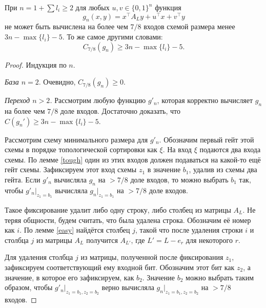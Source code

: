 \documentclass[a4paper, 14pt]{extarticle}
\begin{document}
\begin{theorem} \label{main}
При $n = 1 + \sum l_i \geq 2$ для любых $u, v \in \{0, 1\}^n$ функция
\[
g_n(x, y) = x^\top A_L y + u^\top x + v^\top y
\]
не может быть вычислена на более чем $7/8$ входов схемой размера менее $3n -
\max \{l_i\} - 5$. То же самое другими словами:
\[
C_{7/8}(g_n) \geq 3n - \max \{l_i\} - 5.
\]
\end{theorem}
\begin{proof}
Индукция по $n$.

\emph{База $n = 2$}. Очевидно, $C_{7/8}(g_n) \geq 0$.

\emph{Переход $n > 2$.} Рассмотрим любую функцию $g'_n$, которая корректно
вычисляет $g_n$ на более чем $7/8$ доле входов. Достаточно доказать, что
$C(g_n') \geq 3n - \max \{l_i\} - 5$.

Рассмотрим схему минимального размера для $g'_n$. Обозначим первый гейт этой
схемы в порядке топологической сортировки как $\xi$. На вход $\xi$ подаются
два входа схемы. По лемме \ref{tough} один из этих входов должен подаваться на
какой-то ещё гейт схемы. Зафиксируем этот вход схемы $z_1$ в значение $b_1$,
удалив из схемы два гейта. Если $g'_n$ вычисляла $g_n$ на $> 7/8$ доле входов,
то можно выбрать $b_1$ так, чтобы $g'_n \rvert_{z_1 = b_1}$ вычисляла $g_n
\rvert_{z_1 = b_1}$ на $ > 7/8$ доле входов.

Такое фиксирование удалит либо одну строку, либо столбец из матрицы $A_L$. Не
теряя общности, будем считать, что была удалена строка. Обозначим её номер как
$i$. По лемме \ref{easy} найдётся столбец $j$, такой что после удаления
строки $i$ и столбца $j$ из матрицы $A_L$ получится $A_{L'}$, где $L' = L - e_r$
для некоторого $r$.

Для удаления столбца $j$ из матрицы, полученной после фиксирования $z_1$,
зафиксируем соответствующий ему входной бит. Обозначим этот бит как $z_2$, а
значение, в которое его зафиксируем, как $b_2$. Значение $b_2$ можно выбрать
таким образом, чтобы $g'_n \rvert _ {z_1 = b_1, z_2 = b_2}$ верно вычисляла
$g_n \rvert _ {z_1 = b_1, z_2 = b_2}$ на $> 7/8$ входов.


\end{proof}
\end{document}
